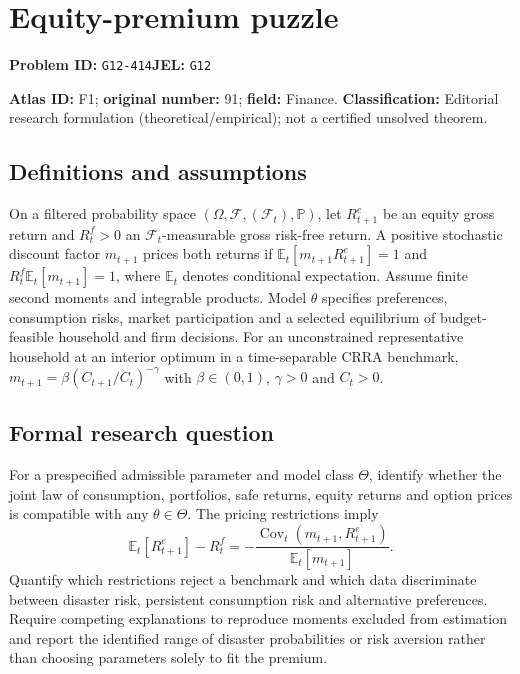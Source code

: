 \documentclass[11pt,a4paper]{article}
\begin{document}
\section*{Equity-premium puzzle}
\textbf{Problem ID:} \texttt{G12-414}\quad \textbf{JEL:} \texttt{G12}\par
\label{problem:OP-0091}
\label{atlas:prob:F1}

\noindent\textbf{Atlas ID:} F1; \textbf{original number:} 91; \textbf{field:} Finance. \textbf{Classification:} Editorial research formulation (theoretical/empirical); not a certified unsolved theorem.

\subsection*{Definitions and assumptions}
On a filtered probability space $(\Omega,\mathcal F,(\mathcal F_t),\mathbb P)$, let $R_{t+1}^e$ be an equity gross return and $R_t^f>0$ an $\mathcal F_t$-measurable gross risk-free return. A positive stochastic discount factor $m_{t+1}$ prices both returns if $\mathbb E_t[m_{t+1}R_{t+1}^e]=1$ and $R_t^f\mathbb E_t[m_{t+1}]=1$, where $\mathbb E_t$ denotes conditional expectation. Assume finite second moments and integrable products. Model $\theta$ specifies preferences, consumption risks, market participation and a selected equilibrium of budget-feasible household and firm decisions. For an unconstrained representative household at an interior optimum in a time-separable CRRA benchmark, $m_{t+1}=\beta(C_{t+1}/C_t)^{-\gamma}$ with $\beta\in(0,1)$, $\gamma>0$ and $C_t>0$.

\subsection*{Formal research question}
For a prespecified admissible parameter and model class $\Theta$, identify whether the joint law of consumption, portfolios, safe returns, equity returns and option prices is compatible with any $\theta\in\Theta$. The pricing restrictions imply
\[
 \mathbb E_t[R_{t+1}^e]-R_t^f
 =-\frac{\operatorname{Cov}_t(m_{t+1},R_{t+1}^e)}{\mathbb E_t[m_{t+1}]}.
\]
Quantify which restrictions reject a benchmark and which data discriminate between disaster risk, persistent consumption risk and alternative preferences. Require competing explanations to reproduce moments excluded from estimation and report the identified range of disaster probabilities or risk aversion rather than choosing parameters solely to fit the premium.
\end{document}
